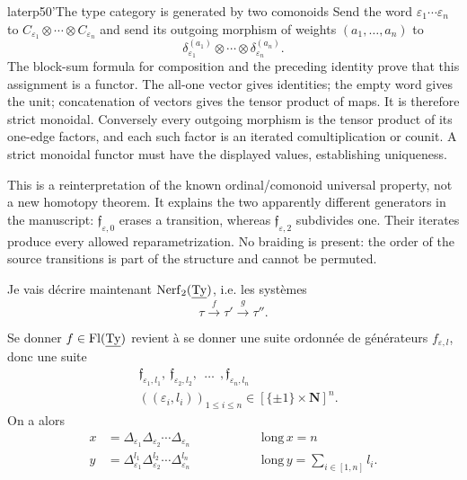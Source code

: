 \begin{dcomment}{later}{p50'}{The type category is generated by two comonoids}
Send the word $\varepsilon_1\cdots\varepsilon_n$ to
$C_{\varepsilon_1}\otimes\cdots\otimes C_{\varepsilon_n}$ and send its outgoing morphism of weights $(a_1,\ldots,a_n)$ to
\[
 \delta_{\varepsilon_1}^{(a_1)}\otimes\cdots\otimes
 \delta_{\varepsilon_n}^{(a_n)}.
\]
The block-sum formula for composition and the preceding identity prove that this assignment is a functor. The all-one vector gives identities; the empty word gives the unit; concatenation of vectors gives the tensor product of maps. It is therefore strict monoidal. Conversely every outgoing morphism is the tensor product of its one-edge factors, and each such factor is an iterated comultiplication or counit. A strict monoidal functor must have the displayed values, establishing uniqueness.

This is a reinterpretation of the known ordinal/comonoid universal property, not a new homotopy theorem. It explains the two apparently different generators in the manuscript: $\mathfrak f_{\varepsilon,0}$ erases a transition, whereas $\mathfrak f_{\varepsilon,2}$ subdivides one. Their iterates produce every allowed reparametrization. No braiding is present: the order of the source transitions is part of the structure and cannot be permuted.
\end{dcomment}


Je vais décrire maintenant $\mathrm{Nerf}_2(\underline{\mathrm{Ty}})$, i.e. les systèmes
\[
\tau \xrightarrow{\ f\ } \tau' \xrightarrow{\ g\ } \tau''.
\]

Se donner $f\in\mathrm{Fl}(\underline{\mathrm{Ty}})$ revient à se donner une suite ordonnée de générateurs $f_{\varepsilon,l}$, donc une suite
\[
\begin{aligned}
&\mathfrak{f}_{\varepsilon_1,l_1},\ \mathfrak{f}_{\varepsilon_2,l_2},\ \ \dots\ \ ,\mathfrak{f}_{\varepsilon_n,l_n}\\
&((\varepsilon_i,l_i))_{1\leq i\leq n}\in[\{\pm1\}\times\mathbf{N}]^n.
\end{aligned}
\]
On a alors
\[
\begin{aligned}
x &= \Delta_{\varepsilon_1}\Delta_{\varepsilon_2}\cdots\Delta_{\varepsilon_n} &\qquad\qquad& \mathrm{long}\,x = n\\
y &= \Delta^{l_1}_{\varepsilon_1}\Delta^{l_2}_{\varepsilon_2}\cdots\Delta^{l_n}_{\varepsilon_n} && \mathrm{long}\,y = \textstyle\sum_{i\in[1,n]} l_i.
\end{aligned}
\]

